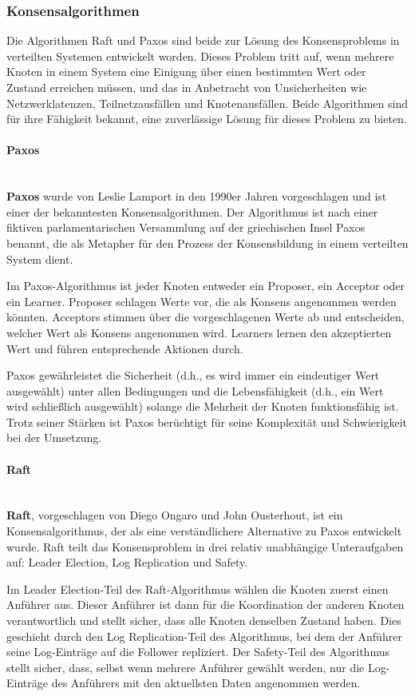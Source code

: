 \subsubsection{Konsensalgorithmen}

Die Algorithmen Raft und Paxos sind beide zur Lösung des Konsensproblems in verteilten Systemen entwickelt worden. Dieses Problem tritt auf, wenn mehrere Knoten in einem System eine Einigung über einen bestimmten Wert oder Zustand erreichen müssen, und das in Anbetracht von Unsicherheiten wie Netzwerklatenzen, Teilnetzausfällen und Knotenausfällen. Beide Algorithmen sind für ihre Fähigkeit bekannt, eine zuverlässige Lösung für dieses Problem zu bieten.
\paragraph{Paxos}\mbox{}\\
\textbf{Paxos} wurde von Leslie Lamport in den 1990er Jahren vorgeschlagen und ist einer der bekanntesten Konsensalgorithmen. Der Algorithmus ist nach einer fiktiven parlamentarischen Versammlung auf der griechischen Insel Paxos benannt, die als Metapher für den Prozess der Konsensbildung in einem verteilten System dient.

Im Paxos-Algorithmus ist jeder Knoten entweder ein Proposer, ein Acceptor oder ein Learner. Proposer schlagen Werte vor, die als Konsens angenommen werden könnten. Acceptors stimmen über die vorgeschlagenen Werte ab und entscheiden, welcher Wert als Konsens angenommen wird. Learners lernen den akzeptierten Wert und führen entsprechende Aktionen durch.

Paxos gewährleistet die Sicherheit (d.h., es wird immer ein eindeutiger Wert ausgewählt) unter allen Bedingungen und die Lebensfähigkeit (d.h., ein Wert wird schließlich ausgewählt) solange die Mehrheit der Knoten funktionsfähig ist. Trotz seiner Stärken ist Paxos berüchtigt für seine Komplexität und Schwierigkeit bei der Umsetzung.
\paragraph{Raft}\mbox{}\\
\textbf{Raft}, vorgeschlagen von Diego Ongaro und John Ousterhout, ist ein Konsensalgorithmus, der als eine verständlichere Alternative zu Paxos entwickelt wurde. Raft teilt das Konsensproblem in drei relativ unabhängige Unteraufgaben auf: Leader Election, Log Replication und Safety.

Im Leader Election-Teil des Raft-Algorithmus wählen die Knoten zuerst einen Anführer aus. Dieser Anführer ist dann für die Koordination der anderen Knoten verantwortlich und stellt sicher, dass alle Knoten denselben Zustand haben. Dies geschieht durch den Log Replication-Teil des Algorithmus, bei dem der Anführer seine Log-Einträge auf die Follower repliziert. Der Safety-Teil des Algorithmus stellt sicher, dass, selbst wenn mehrere Anführer gewählt werden, nur die Log-Einträge des Anführers mit den aktuellsten Daten angenommen werden.

